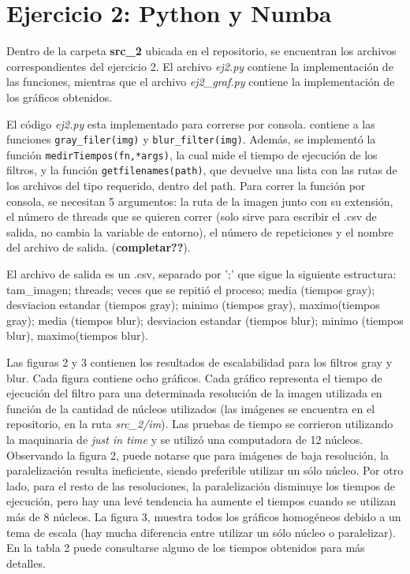 \documentclass[12pt,a4paper]{article}
\begin{document}
\section{Ejercicio 2: Python y Numba}

Dentro de la carpeta \textbf{src\_2} ubicada en el repositorio, se encuentran los archivos correspondientes del ejercicio 2. El archivo \textit{ej2.py} contiene la implementación de las funciones, mientras que el archivo \textit{ej2\_graf.py} contiene la implementación de los gráficos obtenidos. \par 
El código \textit{ej2.py} esta implementado para correrse por consola.
contiene a las funciones \texttt{gray\_filer(img)} y \texttt{blur\_filter(img)}. Además, se implementó la función \texttt{medirTiempos(fn,*args)}, la cual mide el tiempo de ejecución de los filtros, y la función \texttt{getfilenames(path)}, que devuelve una lista con las rutas de los archivos del tipo requerido, dentro del path. Para correr la función por consola, se necesitan 5 argumentos: la ruta de la imagen junto con su extensión, el número de threads que se quieren correr (solo sirve para escribir el .csv de salida, no cambia la variable de entorno), el número de repeticiones y el nombre del archivo de salida. (\textbf{completar??}).\par
El archivo de salida es un .csv, separado por ';' que sigue la siguiente estructura: tam_imagen; threads; veces que se repitió el proceso;  media (tiempos gray); desviacion estandar (tiempos gray); minimo (tiempos gray), maximo(tiempos gray); media (tiempos blur); desviacion estandar (tiempos blur); minimo (tiempos blur), maximo(tiempos blur).

Las figuras 2 y 3 contienen los resultados de escalabilidad para los filtros gray y blur. Cada figura contiene ocho gráficos. Cada gráfico representa el tiempo de ejecución del filtro para una determinada resolución de la imagen utilizada en función de la cantidad de núcleos utilizados (las imágenes se encuentra en el repositorio, en la ruta \textit{src\_2/im}). Las pruebas de tiempo se corrieron utilizando la maquinaria de \textit{just in time} y se utilizó  una computadora de 12 núcleos. Observando la figura 2, puede notarse que para imágenes de baja resolución, la paralelización resulta ineficiente, siendo preferible utilizar un sólo núcleo. Por otro lado, para el resto de las resoluciones, la paralelización disminuye los tiempos de ejecución, pero hay una levé tendencia ha aumente el tiempos cuando se utilizan más de 8 núcleos. La figura 3, muestra todos los gráficos homogéneos debido a un tema de escala (hay mucha diferencia entre utilizar un sólo núcleo o paralelizar). En la tabla 2 puede consultarse alguno de los tiempos obtenidos para más detalles. 
\end{document}
